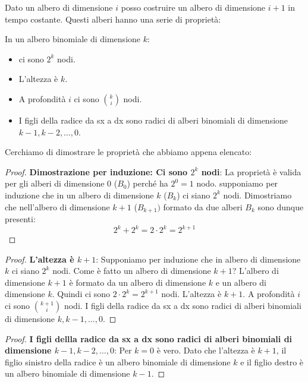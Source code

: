 \documentclass[a4paper]{article}
\begin{document}
Dato un albero di dimensione $i$ posso costruire un albero di dimensione $i+1$ in tempo costante. Questi alberi hanno una serie di proprietà:
\begin{lemma}
  In un albero binomiale di dimensione $k$: 
  \begin{itemize}
    \item ci sono $2^k$ nodi.
    \item L'altezza è $k$.
    \item A profondità $i$ ci sono $\binom{k}{i}$ nodi.
    \item I figli della radice da sx a dx sono radici di alberi binomiali di dimensione $k-1, k-2, \dots, 0$.
  \end{itemize}
\end{lemma}
\noindent
Cerchiamo di dimostrare le proprietà che abbiamo appena elencato:
\begin{proof}
  \textbf{Dimostrazione per induzione: Ci sono $2^k$ nodi}: La proprietà è valida per gli alberi di dimensione 0 ($B_0$) perché ha $2^0 = 1$ nodo.
  supponiamo per induzione che in un albero di dimensione $k$ ($B_k$) ci siano $2^k$ nodi. Dimostriamo che nell'albero di dimensione $k+1$ ($B_{k+1}) $
  formato da due alberi $B_k$ sono dunque presenti:
  \[2^k + 2^k = 2 \cdot 2^k = 2^{k+1}\]
\end{proof}

\begin{proof}
  \textbf{L'altezza è $k+1$}:
  Supponiamo per induzione che in albero di dimensione $k$ ci siano $2^k$ nodi.
  Come è fatto un albero di dimensione $k+1$?
  \noindent
  L'albero di dimensione $k+1$ è formato da un albero di dimensione $k$ e un albero di dimensione $k$.
  Quindi ci sono $2 \cdot 2^k = 2^{k+1}$ nodi.
  L'altezza è $k+1$.
  A profondità $i$ ci sono $\binom{k+1}{i}$ nodi.
  I figli della radice da sx a dx sono radici di alberi binomiali di dimensione $k, k-1, \dots, 0$.
\end{proof}

\begin{proof}
  \textbf{I figli dellla radice da sx a dx sono radici di alberi binomiali di dimensione $k-1, k-2, \dots, 0$}: 
  Per $k=0$ è vero.
  Dato che l'altezza è $k+1$, il figlio sinistro della radice è un albero binomiale di dimensione $k$ e il figlio destro è un albero binomiale di dimensione $k-1$.
\end{proof}
\end{document}
